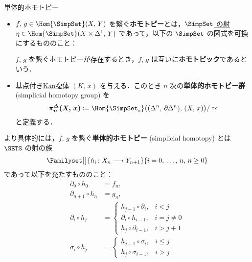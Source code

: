 \documentclass[TQFT_main]{subfiles}
\begin{document}
\begin{mydef}[label=def:SimpSet-homotopic,breakable]{単体的ホモトピー}
    \begin{itemize}
        \item $f,\, g \in \Hom{\SimpSet} (X,\, Y)$ を繋ぐ\textbf{ホモトピー}とは，\hyperref[def:SimpSet]{$\SimpSet$ の射} $\eta \in \Hom{\SimpSet}(X \times \Delta^1,\, Y)$ であって，以下の $\SimpSet$ の図式を可換にするもののこと：
        \begin{center}
        \end{center}
        $f,\, g$ を繋ぐホモトピーが存在するとき，$f,\, g$ は互いに\textbf{ホモトピック}であるという．
        \item 基点付き\hyperref[def:KanCplx]{Kan複体} $(K,\, x)$ を与える．このとき $n$ 次の\textbf{単体的ホモトピー群} (simplicial homotopy group) を
        \begin{align}
            \bm{\pi^\Delta_n (X,\, x)} \coloneqq \Hom{\SimpSet_*} \bigl( (\Delta^n,\, \partial\Delta^n),\, (X,\, x) \bigr) / \simeq
        \end{align}
        と定義する．
    \end{itemize}
    

    \tcblower

    より具体的には，$f,\, g$ を繋ぐ\textbf{単体的ホモトピー} (simplicial homotopy) とは $\SETS$ の射の族
    \begin{align}
        \Familyset[\big]{h_i \colon X_n \lto Y_{n+1}}{i = 0,\, \dots,\, n,\, n \ge 0}
    \end{align}
    であって以下を充たすもののこと：
    \begin{align}
        \partial_0 \circ h_0 &= f_n, \\
        \partial_{n+1} \circ h_n &= g_n, \\
        \partial_i \circ h_j &=
        \begin{cases}
            h_{j-1} \circ \partial_{i}, &i < j \\
            \partial_i \circ h_{i-1}, &i=j \neq 0 \\
            h_j \circ \partial_{i-1}, &i > j+1
        \end{cases} \\
        \sigma_i \circ h_j &=
        \begin{cases}
            h_{j+1} \circ \sigma_i, &i \le j \\
            h_j \circ \sigma_{i-1}, &i > j
        \end{cases}
    \end{align}
    
\end{mydef}
\end{document}
